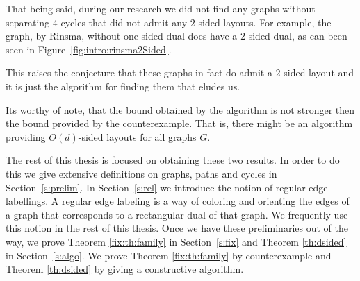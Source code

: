   That being said, during our research we did not find any graphs without separating $4$-cycles that did not admit any $2$-sided layouts.
  For example, the graph, by Rinsma, without one-sided dual does have a $2$-sided dual, as can been seen in Figure~\ref{fig:intro:rinsma2Sided}.

  This raises the conjecture that these graphs in fact do admit a $2$-sided layout and it is just the algorithm for finding them that eludes us.

  Its worthy of note, that the bound obtained by the algorithm is not stronger then the bound provided by the counterexample. That is, there might be an algorithm providing $O(d)$-sided layouts for all graphs $G$.

  The rest of this thesis is focused on obtaining these two results.
  In order to do this we give extensive definitions on graphs, paths and cycles in Section~\ref{s:prelim}. In Section~\ref{s:rel} we introduce the notion of regular edge labellings.  A regular edge labeling is a way of coloring and orienting the edges of a graph that corresponds to a rectangular dual of that graph.
  We frequently use this notion in the rest of this thesis.
  Once we have these preliminaries out of the way, we prove Theorem \ref{fix:th:family} in Section~\ref{s:fix} and Theorem \ref{th:dsided} in Section~\ref{s:algo}. We prove Theorem \ref{fix:th:family} by counterexample and Theorem \ref{th:dsided} by giving a constructive algorithm.
